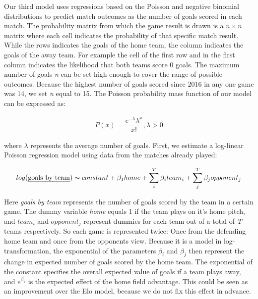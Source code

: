 \documentclass[12pt,a4paper]{article}
\begin{document}
Our third model uses regressions based on the Poisson and negative
binomial distributions to predict match outcomes as the number of goals
scored in each match. The probability matrix from which the game result
is drawn is a \(n \times n\) matrix where each cell indicates the
probability of that specific match result. While the rows indicates the
goals of the home team, the column indicates the goals of the away team.
For example the cell of the first row and in the first column indicates
the likelihood that both teams score \(0\) goals. The maximum number of
goals \emph{n} can be set high enough to cover the range of possible
outcomes. Because the highest number of goals scored since 2016 in any
one game was 14, we set \emph{n} equal to 15. The Poisson probability
mass function of our model can be expressed as:

\begin{align}
P(x) = \dfrac{e^{-\lambda}\lambda^x}{x!}, \lambda > 0
\end{align}

where \(\lambda\) represents the average number of goals. First, we
estimate a log-linear Poisson regression model using data from the
matches already played:

\begin{align}
log(\text{\emph{goals by team}}) \sim constant + \beta_1 home + \sum_{i}^{T} \beta_i team_i + \sum_{j}^{T} \beta_j opponent_j
\end{align}

Here \emph{goals by team} represents the number of goals scored by the
team in a certain game. The dummy variable \emph{home} equals 1 if the
team plays on it's home pitch, and \(team_i\) and \(opponent_j\)
represent dummies for each team out of a total of \emph{T} teams
respectively. So each game is represented twice: Once from the defending
home team and once from the opponents view. Because it is a model in
log-transformation, the exponential of the parameters \(\beta_i\) and
\(\beta_j\) then represent the change in expected number of goals scored
by the home team. The exponential of the constant specifies the overall
expected value of goals if a team plays away, and \(e^{\beta_1}\) is the
expected effect of the home field advantage. This could be seen as an
improvement over the Elo model, because we do not fix this effect in
advance.
\end{document}

